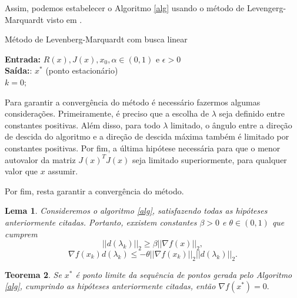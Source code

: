 \documentclass[12pt,a4paper]{article}
\newtheorem{teo}{Teorema}[section]
\newtheorem{lema}[teo]{Lema}
\newcounter{ex}[section]
\begin{document}
	Assim, podemos estabelecer o Algoritmo \ref{alg} usando o método de Levengerg-Marquardt visto em \cite{aes}.
	
	\begin{algorithm}[H] \label{alg}
		\caption{Método de Levenberg-Marquardt com busca linear}
		\textbf{Entrada:} $R(x), J(x), x_0, \alpha \in (0,1)$ e $\epsilon>0$\\
		\textbf{Saída:}: $x^*$ (ponto estacionário) \\
		$k = 0;$\\
	\end{algorithm}	

	
	Para garantir a convergência do método é necessário fazermos algumas considerações. Primeiramente, é preciso que a escolha de $\lambda$ seja definido entre constantes positivas. Além disso, para todo $\lambda$ limitado, o ângulo entre a direção de descida do algoritmo e a direção de descida máxima também é limitado por constantes positivas. Por fim, a última hipótese necessária para que o menor autovalor da matriz $J(x)^TJ(x)$ seja limitado superiormente, para qualquer valor que $x$ assumir.
	
	Por fim, resta garantir a convergência do método. 
	
	\begin{lema}
		Consideremos o algoritmo \ref{alg}, satisfazendo todas as hipóteses anteriormente citadas. Portanto, exxistem constantes $\beta > 0$ e $\theta \in (0,1)$ que cumprem
		$$||d(\lambda_k)||_2\geq\beta||\nabla f(x)||_2,$$
		$$\nabla f(x_k)d(\lambda_k)\leq -\theta ||\nabla f(x_k)||_2||d(\lambda_k)||_2.$$
	\end{lema}

	\begin{teo}
		Se $x^*$ é ponto limite da sequência de pontos gerada pelo Algoritmo \ref{alg}, cumprindo as hipóteses anteriormente citadas, então $\nabla f(x^*)=0.$
	\end{teo}
\end{document}
